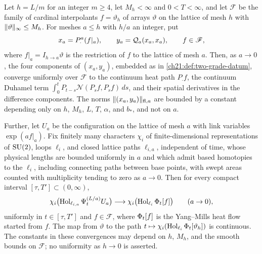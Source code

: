 \begin{lemma}\label{ch25:lem:fixed-smooth-prefix}
Let $h=L/m$ for an integer $m\ge4$, let $M_h<\infty$ and $0<T<\infty$, and let $\mathscr F$ be the family of cardinal interpolants $f=\vartheta_h$ of arrays $\vartheta$ on the lattice of mesh $h$ with $\lVert \vartheta\rVert_\infty\le M_h$. For meshes $a\le h$ with $h/a$ an integer, put
\[
 x_a=P^a_\cdot(f|_a),\qquad y_a=\mathcal Q_{a}(x_a,x_a),\qquad f\in\mathscr F,
\]
where $f|_a=I_{h\to a}\vartheta$ is the restriction of $f$ to the lattice of mesh $a$. Then, as $a\to0$, the four components of $(x_a,y_a)$, embedded as in \cref{ch21:def:two-grade-datum}, converge uniformly over $\mathscr F$ to the continuum heat path $P_\cdot f$, the continuum Duhamel term $\int_0^tP_{t-s}\mathcal N(P_sf,P_sf)\,ds$, and their spatial derivatives in the difference components. The norms $\lVert (x_a,y_a)\rVert_{\mathrm{fl},a}$ are bounded by a constant depending only on $h$, $M_h$, $L$, $T$, $\alpha$, and $b_*$, and not on $a$.

Further, let $U_a$ be the configuration on the lattice of mesh $a$ with link variables $\exp(a f|_a)$. Fix finitely many characters $\chi_i$ of finite-dimensional representations of $\mathrm{SU}(2)$, loops $\ell_i$, and closed lattice paths $\ell_{i,a}$, independent of time, whose physical lengths are bounded uniformly in $a$ and which admit based homotopies to the $\ell_i$, including connecting paths between base points, with swept areas counted with multiplicity tending to zero as $a\to0$. Then for every compact interval $[\tau,T']\subset(0,\infty)$,
\[
 \chi_i\bigl(\operatorname{Hol}_{\ell_{i,a}}\Psi^{(L/a)}_tU_a\bigr)\longrightarrow\chi_i\bigl(\operatorname{Hol}_{\ell_i}\Phi_t[f]\bigr)\qquad(a\to0),
\]
uniformly in $t\in[\tau,T']$ and $f\in\mathscr F$, where $\Phi_t[f]$ is the Yang--Mills heat flow started from $f$. The map from $\vartheta$ to the path $t\mapsto\chi_i(\operatorname{Hol}_{\ell_i}\Phi_t[\vartheta_h])$ is continuous. The constants in these convergences may depend on $h$, $M_h$, and the smooth bounds on $\mathscr F$; no uniformity as $h\to0$ is asserted.
\end{lemma}

